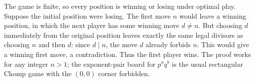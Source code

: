 The game is finite, so every position is winning or losing under optimal play. Suppose the initial position were losing. The first move $n$ would leave a winning position, in which the next player has some winning move $d\ne n$. But choosing $d$ immediately from the original position leaves exactly the same legal divisors as choosing $n$ and then $d$: since $d\mid n$, the move $d$ already forbids $n$. This would give a winning first move, a contradiction. Thus the first player wins. The proof works for any integer $n>1$; the exponent-pair board for $p^aq^b$ is the usual rectangular Chomp game with the $(0,0)$ corner forbidden.
